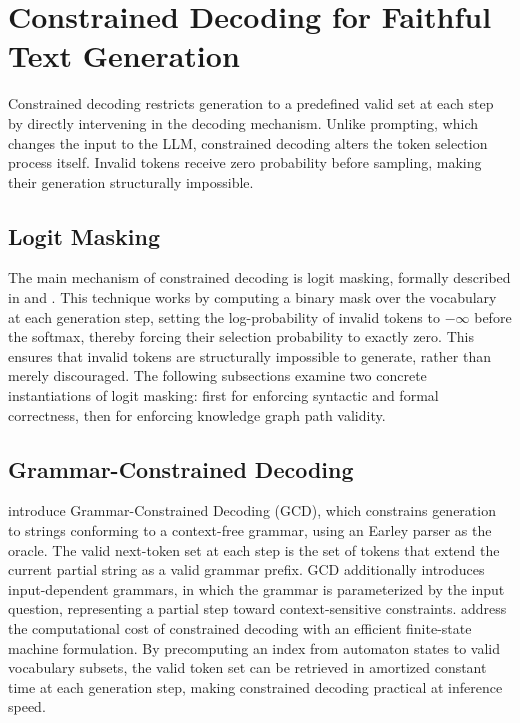 \section{Constrained Decoding for Faithful Text Generation}
\label{sec:constrained}

Constrained decoding restricts generation to a predefined valid set at each step by directly intervening in the decoding mechanism. Unlike prompting, which changes the input to the LLM, constrained decoding alters the token selection process itself. Invalid tokens receive zero probability before sampling, making their generation structurally impossible.

\subsection{Logit Masking}

The main mechanism of constrained decoding is logit masking, formally described in \citet{geng2023grammarconstrained} and \citet{willard2023outlines}. This technique works by computing a binary mask over the vocabulary at each generation step, setting the log-probability of invalid tokens to $-\infty$ before the softmax, thereby forcing their selection probability to exactly zero. This ensures that invalid tokens are structurally impossible to generate, rather than merely discouraged. The following subsections examine two concrete instantiations of logit masking: first for enforcing syntactic and formal correctness, then for enforcing knowledge graph path validity.

\subsection{Grammar-Constrained Decoding}

\citet{geng2023grammarconstrained} introduce Grammar-Constrained Decoding (GCD), which constrains generation to strings conforming to a context-free grammar, using an Earley parser as the oracle. The valid next-token set at each step is the set of tokens that extend the current partial string as a valid grammar prefix. GCD additionally introduces input-dependent grammars, in which the grammar is parameterized by the input question, representing a partial step toward context-sensitive constraints. \citet{willard2023outlines} address the computational cost of constrained decoding with an efficient finite-state machine formulation. By precomputing an index from automaton states to valid vocabulary subsets, the valid token set can be retrieved in amortized constant time at each generation step, making constrained decoding practical at inference speed.

